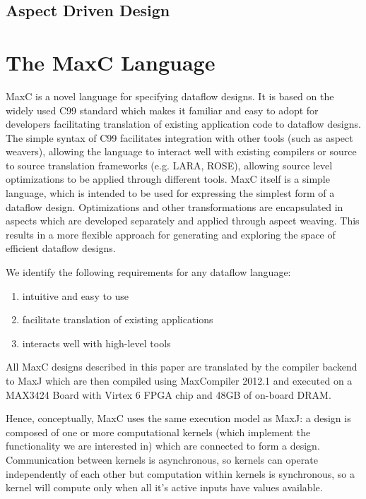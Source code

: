 
\subsection{Aspect Driven Design}








\section{The  MaxC Language}

MaxC is a novel language for specifying dataflow designs. It is based
on the widely used C99 standard which makes it familiar and easy to
adopt for developers facilitating translation of existing application
code to dataflow designs. The simple syntax of C99 facilitates
integration with other tools (such as aspect weavers), allowing the
language to interact well with existing compilers or source to source
translation frameworks (e.g. LARA, ROSE), allowing source level
optimizations to be applied through different tools. MaxC itself is a
simple language, which is intended to be used for expressing the
simplest form of a dataflow design. Optimizations and other
transformations are encapsulated in aspects which are developed
separately and applied through aspect weaving. This results in a more
flexible approach for generating and exploring the space of efficient
dataflow designs.

We identify the following requirements for any dataflow language:
\begin{enumerate}
\item intuitive and easy to use
\item facilitate translation of existing applications
\item interacts well with high-level tools
\end{enumerate}


All MaxC designs described in this paper are translated by the
compiler backend to MaxJ which are then compiled using MaxCompiler
2012.1 and executed on a MAX3424 Board with Virtex 6 FPGA chip and
48GB of on-board DRAM.

Hence, conceptually, MaxC uses the same execution model as MaxJ: a
design is composed of one or more computational kernels (which
implement the functionality we are interested in) which are connected
to form a design. Communication between kernels is asynchronous, so
kernels can operate independently of each other but computation within
kernels is synchronous, so a kernel will compute only when all it's
active inputs have values available.

